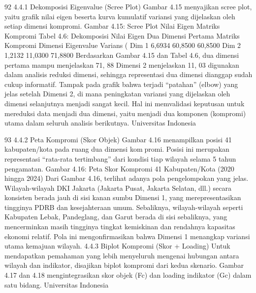 92
4.4.1 Dekomposisi Eigenvalue (Scree Plot)
Gambar 4.15 menyajikan scree plot, yaitu grafik nilai eigen beserta kurva kumulatif
variansi yang dijelaskan oleh setiap dimensi kompromi.
Gambar 4.15: Scree Plot Nilai Eigen Matriks Kompromi
Tabel 4.6: Dekomposisi Nilai Eigen Dua Dimensi Pertama Matriks Kompromi
Dimensi Eigenvalue Varians (%
Dim 1 6,6934 60,8500 60,8500
Dim 2 1,2132 11,0300 71,8800
Berdasarkan Gambar 4.15 dan Tabel 4.6, dua dimensi pertama mampu menjelaskan
71, 88%
Dimensi 2 menjelaskan 11, 03%
digunakan dalam analisis reduksi dimensi, sehingga representasi dua dimensi dianggap
sudah cukup informatif.
Tampak pada grafik bahwa terjadi “patahan” (elbow) yang jelas setelah Dimensi 2, di
mana peningkatan variansi yang dijelaskan oleh dimensi selanjutnya menjadi sangat kecil.
Hal ini memvalidasi keputusan untuk mereduksi data menjadi dua dimensi, yaitu menjadi
dua komponen (kompromi) utama dalam seluruh analisis berikutnya.
Universitas Indonesia

93
4.4.2 Peta Kompromi (Skor Objek)
Gambar 4.16 menampilkan posisi 41 kabupaten/kota pada ruang dua dimensi kompromi. Posisi ini merupakan representasi “rata-rata tertimbang” dari kondisi tiap wilayah
selama 5 tahun pengamatan.
Gambar 4.16: Peta Skor Kompromi 41 Kabupaten/Kota (2020 hingga 2024)
Dari Gambar 4.16, terlihat adanya pola pengelompokan yang jelas. Wilayah-wilayah
DKI Jakarta (Jakarta Pusat, Jakarta Selatan, dll.) secara konsisten berada jauh di sisi kanan
sumbu Dimensi 1, yang merepresentasikan tingginya PDRB dan kesejahteraan umum.
Sebaliknya, wilayah-wilayah seperti Kabupaten Lebak, Pandeglang, dan Garut berada di
sisi sebaliknya, yang mencerminkan masih tingginya tingkat kemiskinan dan rendahnya
kapasitas ekonomi relatif. Pola ini mengonfirmasikan bahwa Dimensi 1 menangkap
variansi utama kemajuan wilayah.
4.4.3 Biplot Kompromi (Skor + Loading)
Untuk mendapatkan pemahaman yang lebih menyeluruh mengenai hubungan antara
wilayah dan indikator, disajikan biplot kompromi dari kedua skenario. Gambar 4.17 dan
4.18 mengintegrasikan skor objek (Fc) dan loading indikator (Gc) dalam satu bidang.
Universitas Indonesia

